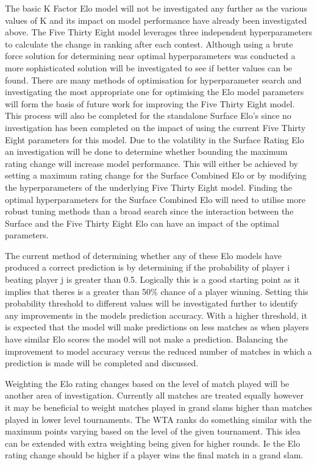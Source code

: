 \documentclass[12pt,a4paper]{article}
\begin{document}
The basic K Factor Elo model will not be investigated any further as the various values
of K and its impact on model performance have already been investigated above. The Five
Thirty Eight model leverages three independent hyperparameters to calculate the change
in ranking after each contest. Although using a brute force solution for determining near
optimal hyperparameters was conducted a more sophisticated solution will be investigated to
see if better values can be found. There are many methods of optimisation for
hyperparameter search \cite{claesen_hyperparameter_2015} and investigating the
most appropriate one for optimising the Elo model parameters will form the basis of
future work for improving the Five Thirty Eight model. This process will also be completed
for the standalone Surface Elo's since no investigation has been completed on the impact of
using the current Five Thirty Eight parameters for this model.
Due to the volatility in the Surface Rating Elo an investigation will be done to determine
whether bounding the maximum rating change will increase model performance. This will either
be achieved by setting a maximum rating change for the Surface Combined Elo or by modifying
the hyperparameters of the underlying Five Thirty Eight model. Finding the optimal hyperparameters
for the Surface Combined Elo will need to utilise more robust tuning methods than a broad search
since the interaction between the Surface and the Five Thirty Eight Elo can have an impact of the
optimal parameters.

The current method of determining whether any of these Elo models have produced a correct
prediction is by determining if the probability of player i beating player j is greater
than 0.5. Logically this is a good starting point as it implies that theres is a greater
than 50\% chance of a player winning. Setting this probability threshold to different values
will be investigated further to identify any improvements in the models prediction accuracy.
With a higher threshold, it is expected that the model will make predictions on less
matches as when players have similar Elo scores the model will not make a prediction.
Balancing the improvement to model accuracy versus the reduced number of matches in which
a prediction is made will be completed and discussed.

Weighting the Elo rating changes based on the level of match played will be another area of
investigation. Currently all matches are treated equally however it may be beneficial to weight
matches played in grand slams higher than matches played in lower level tournaments. The WTA ranks
do something similar with the maximum points varying based on the level of the given tournament.
This idea can be extended with extra weighting being given for higher rounds. Ie the Elo rating
change should be higher if a player wins the final match in a grand slam.
\clearpage
\end{document}
